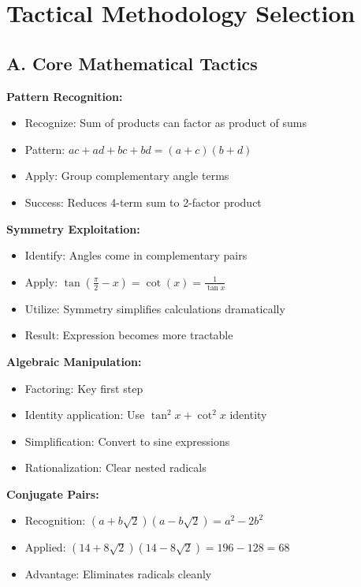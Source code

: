 \documentclass[12pt]{article}
\begin{document}
\section{Tactical Methodology Selection}

\begin{tacticalbox}

\subsection*{A. Core Mathematical Tactics}

\textbf{Pattern Recognition:}
\begin{itemize}
    \item Recognize: Sum of products can factor as product of sums
    \item Pattern: $ac + ad + bc + bd = (a+c)(b+d)$
    \item Apply: Group complementary angle terms
    \item Success: Reduces 4-term sum to 2-factor product
\end{itemize}

\textbf{Symmetry Exploitation:}
\begin{itemize}
    \item Identify: Angles come in complementary pairs
    \item Apply: $\tan(\frac{\pi}{2}-x) = \cot(x) = \frac{1}{\tan x}$
    \item Utilize: Symmetry simplifies calculations dramatically
    \item Result: Expression becomes more tractable
\end{itemize}

\textbf{Algebraic Manipulation:}
\begin{itemize}
    \item Factoring: Key first step
    \item Identity application: Use $\tan^2 x + \cot^2 x$ identity
    \item Simplification: Convert to sine expressions
    \item Rationalization: Clear nested radicals
\end{itemize}

\textbf{Conjugate Pairs:}
\begin{itemize}
    \item Recognition: $(a + b\sqrt{2})(a - b\sqrt{2}) = a^2 - 2b^2$
    \item Applied: $(14 + 8\sqrt{2})(14 - 8\sqrt{2}) = 196 - 128 = 68$
    \item Advantage: Eliminates radicals cleanly
\end{itemize}


\end{tacticalbox}
\end{document}

